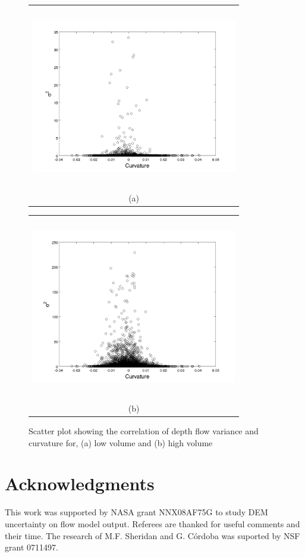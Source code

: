 \documentclass[a4paper,fleqn]{article}
\begin{document}
\begin{figure}[H]
    \begin{minipage}[b]{0.6\textwidth}
        \begin{tabular}{c}
        \includegraphics[width=9cm,height=8cm,keepaspectratio]{curvature_vs_sigma2.jpg}\\
        (a)
        \end{tabular}
    \end{minipage}
    \begin{minipage}{0.6\textwidth}
        \begin{tabular}{c}
        \includegraphics[width=9cm,height=8cm,keepaspectratio]{curvature_vs_sigma2_high_vol.jpg}\\
        (b)
        \end{tabular}
    \end{minipage} 
\caption{Scatter plot showing the correlation of depth flow variance and curvature for, (a) low volume and (b) high volume}
\label{fig7}  
\end{figure}




\section*{Acknowledgments}
This work was supported by NASA grant NNX08AF75G to study DEM
uncertainty on flow model output.  Referees are thanked for useful
comments and their time. The research of M.F. Sheridan and G. C\'ordoba was suported by NSF grant 0711497.




\end{document}
